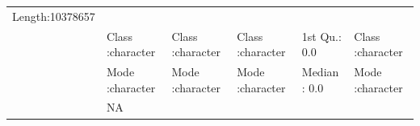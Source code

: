 \documentclass[]{article}
\begin{document}
\begin{longtable}[]{@{}llllll@{}}
\begin{minipage}[t]{0.16\columnwidth}
Length:10378657\strut
\end{minipage}\tabularnewline
\begin{minipage}[t]{0.04\columnwidth}\raggedright\strut
\strut
\end{minipage} & \begin{minipage}[t]{0.16\columnwidth}\raggedright\strut
Class :character\strut
\end{minipage} & \begin{minipage}[t]{0.16\columnwidth}\raggedright\strut
Class :character\strut
\end{minipage} & \begin{minipage}[t]{0.16\columnwidth}\raggedright\strut
Class :character\strut
\end{minipage} & \begin{minipage}[t]{0.14\columnwidth}\raggedright\strut
1st Qu.: 0.0\strut
\end{minipage} & \begin{minipage}[t]{0.16\columnwidth}\raggedright\strut
Class :character\strut
\end{minipage}\tabularnewline
\begin{minipage}[t]{0.04\columnwidth}\raggedright\strut
\strut
\end{minipage} & \begin{minipage}[t]{0.16\columnwidth}\raggedright\strut
Mode :character\strut
\end{minipage} & \begin{minipage}[t]{0.16\columnwidth}\raggedright\strut
Mode :character\strut
\end{minipage} & \begin{minipage}[t]{0.16\columnwidth}\raggedright\strut
Mode :character\strut
\end{minipage} & \begin{minipage}[t]{0.14\columnwidth}\raggedright\strut
Median : 0.0\strut
\end{minipage} & \begin{minipage}[t]{0.16\columnwidth}\raggedright\strut
Mode :character\strut
\end{minipage}\tabularnewline
\begin{minipage}[t]{0.04\columnwidth}\raggedright\strut
\strut
\end{minipage} & \begin{minipage}[t]{0.16\columnwidth}\raggedright\strut
NA\strut
\end{minipage} & \begin{minipage}[t]{0.16\columnwidth}\raggedright\strut

\end{minipage}
\end{longtable}
\end{document}
